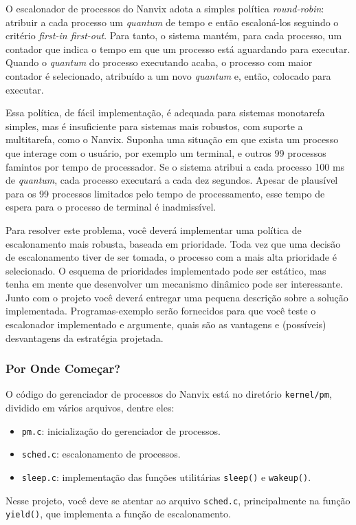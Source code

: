 \documentclass[11pt]{article}
\begin{document}
O escalonador de processos do Nanvix adota a simples política \textit{round-robin}: atribuir a cada processo um \textit{quantum} de tempo e então escaloná-los seguindo o critério \textit{first-in first-out}. Para tanto, o sistema mantém, para cada processo, um contador que indica o tempo em que um processo está aguardando para executar. Quando o \textit{quantum} do processo executando acaba, o processo com maior contador é selecionado, atribuído a um novo \textit{quantum} e, então, colocado para executar.

Essa política, de fácil implementação, é adequada para sistemas monotarefa simples, mas é insuficiente para sistemas mais robustos, com suporte a multitarefa, como o Nanvix. Suponha uma situação em que exista um processo que interage com o usuário, por exemplo um terminal, e outros 99 processos famintos por tempo de processador. Se o sistema atribui a cada processo 100 ms de \textit{quantum}, cada processo executará a cada dez segundos. Apesar de plausível para os 99 processos limitados pelo tempo de processamento, esse tempo de espera para o processo de terminal é inadmissível.

Para resolver este problema, você deverá implementar uma política de escalonamento mais robusta, baseada em prioridade. Toda vez que uma decisão de escalonamento tiver de ser tomada, o processo com a mais alta prioridade é selecionado. O esquema de prioridades implementado pode ser estático, mas tenha em mente que desenvolver um mecanismo dinâmico pode ser interessante. Junto com o projeto você deverá entregar uma pequena descrição sobre a solução implementada. Programas-exemplo serão fornecidos para que você teste o escalonador implementado e argumente, quais são as vantagens e (possíveis) desvantagens da estratégia projetada.

\subsubsection*{Por Onde Começar?}

O código do gerenciador de processos do Nanvix está no diretório \texttt{kernel/pm}, dividido em vários arquivos, dentre eles:

\begin{itemize}
    \item \texttt{pm.c}: inicialização do gerenciador de processos.
    \item \texttt{sched.c}: escalonamento de processos.
    \item \texttt{sleep.c}: implementação das funções utilitárias \texttt{sleep()} e \texttt{wakeup()}.
\end{itemize}

Nesse projeto, você deve se atentar ao arquivo \texttt{sched.c}, principalmente na função \texttt{yield()}, que implementa a função de escalonamento.
\end{document}

